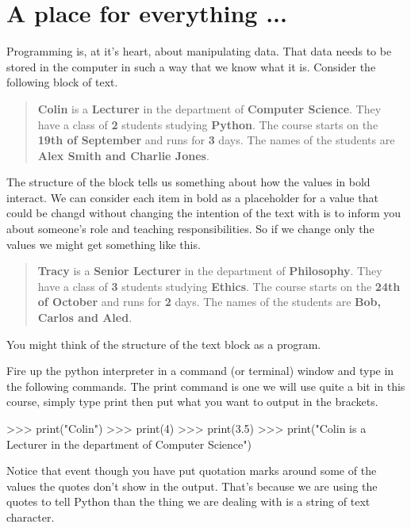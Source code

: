\section{A place for everything ...} \label{sec:Variables}

Programming is, at it's heart, about manipulating data. That data needs to be stored in the computer in such a way that we know what it is. Consider the following block of text.

\begin{quote}
    \textbf{Colin} is a \textbf{Lecturer} in the department of \textbf{Computer Science}. They have a class of \textbf{2} students studying \textbf{Python}. The course starts on the \textbf{19th of September} and runs for \textbf{3} days. The names of the students are \textbf{Alex Smith and Charlie Jones}.
\end{quote}

The structure of the block tells us something about how the values in bold interact. We can consider each item in bold as a placeholder for a value that could be changd without changing the intention of the text with is to inform you about someone's role and teaching responsibilities. So if we change only the values we might get something like this.

\begin{quote}
    \textbf{Tracy} is a \textbf{Senior Lecturer} in the department of \textbf{Philosophy}. They have a class of \textbf{3} students studying \textbf{Ethics}. The course starts on the \textbf{24th of October} and runs for \textbf{2} days. The names of the students are \textbf{Bob, Carlos and Aled}.
\end{quote}

You might think of the structure of the text block as a program.


Fire up the python interpreter in a command (or terminal)  window and type in the following commands. The print command is one we will use quite a bit in this course, simply type print then put what you want to output in the brackets.

\begin{python}[]
>>> print("Colin")
>>> print(4)
>>> print(3.5)  
>>> print("Colin is a Lecturer in the department of Computer Science")
\end{python}

Notice that event though you have put quotation marks around some of the values the quotes don't show in the output. That's because we are using the quotes to tell Python than the thing we are dealing with is a string of text character. 

